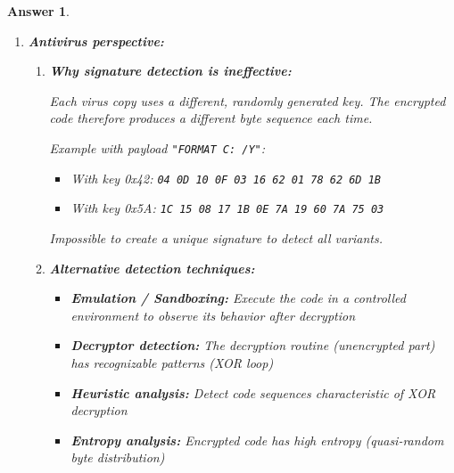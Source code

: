 \documentclass[a4paper,11pt]{article}
\theoremstyle{plain}
\newtheorem{correction}{Answer}
\theoremstyle{definition}
\begin{document}
\begin{correction}
\begin{enumerate}
The modulo operator (\texttt{\%}) allows ``wrapping'' around the key: when reaching the end of the key, we start over from the beginning.

Example with \texttt{"SECRET"} (6 characters) on \texttt{"FORMAT C: /Y"} (12 characters):
\begin{itemize}
\item Position 0: 'F' $\oplus$ 'S'
\item Position 1: 'O' $\oplus$ 'E'
\item \ldots
\item Position 6: ' ' $\oplus$ 'S' (back to key start)
\end{itemize}

\item \textbf{Antivirus perspective:}

\begin{enumerate}
\item \textbf{Why signature detection is ineffective:}

Each virus copy uses a different, randomly generated key. The encrypted code therefore produces a different byte sequence each time.

Example with payload \texttt{"FORMAT C: /Y"}:
\begin{itemize}
\item With key 0x42: \texttt{04 0D 10 0F 03 16 62 01 78 62 6D 1B}
\item With key 0x5A: \texttt{1C 15 08 17 1B 0E 7A 19 60 7A 75 03}
\end{itemize}

Impossible to create a unique signature to detect all variants.

\item \textbf{Alternative detection techniques:}

\begin{itemize}
\item \textbf{Emulation / Sandboxing:} Execute the code in a controlled environment to observe its behavior after decryption
\item \textbf{Decryptor detection:} The decryption routine (unencrypted part) has recognizable patterns (XOR loop)
\item \textbf{Heuristic analysis:} Detect code sequences characteristic of XOR decryption
\item \textbf{Entropy analysis:} Encrypted code has high entropy (quasi-random byte distribution)
\end{itemize}

\end{enumerate}


\end{enumerate}
\end{correction}
\end{document}
